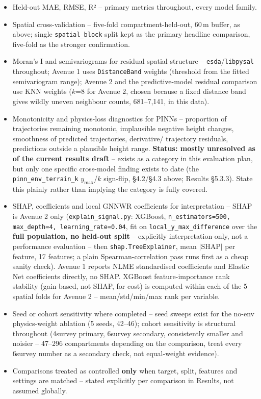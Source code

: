 \begin{itemize}
\setlength\itemsep{0pt}
\item Held-out MAE, RMSE, R² -- primary metrics throughout, every model family.
\item Spatial cross-validation -- five-fold compartment-held-out, 60\,m buffer, as above; single
\texttt{spatial\_block} split kept as the primary headline comparison, five-fold as the stronger
confirmation.
\item Moran's I and semivariograms for residual spatial structure -- \texttt{esda}/\texttt{libpysal}
throughout; Avenue 1 uses \texttt{DistanceBand} weights (threshold from the fitted semivariogram
range); Avenue 2 and the predictive-model residual comparison use KNN weights ($k$=8 for Avenue 2,
chosen because a fixed distance band gives wildly uneven neighbour counts, 681--7,141, in this
data).
\item Monotonicity and physics-loss diagnostics for PINNs -- proportion of trajectories remaining
monotonic, implausible negative height changes, smoothness of predicted trajectories, derivative/
trajectory residuals, predictions outside a plausible height range. \textbf{Status: mostly
unresolved as of the current results draft} -- exists as a category in this evaluation plan, but
only one specific cross-model finding exists to date (the \texttt{pinn\_env\_terrain\_k}
$y_{\max}$/$k$ sign-flip, \S4.2/\S4.3 above; Results \S5.3.3). State this plainly rather than
implying the category is fully covered.
\item SHAP, coefficients and local GNNWR coefficients for interpretation -- SHAP is Avenue 2 only
(\texttt{explain\_signal.py}: XGBoost, \texttt{n\_estimators=500, max\_depth=4, learning\_rate=0.04},
fit on \texttt{local\_y\_max\_difference} over the \textbf{full population, no held-out split} --
explicitly interpretation-only, not a performance evaluation -- then \texttt{shap.TreeExplainer},
mean $|\text{SHAP}|$ per feature, 17 features; a plain Spearman-correlation pass runs first as a
cheap sanity check). Avenue 1 reports NLME standardised coefficients and Elastic Net coefficients
directly, no SHAP. XGBoost feature-importance rank stability (gain-based, not SHAP, for cost) is
computed within each of the 5 spatial folds for Avenue 2 -- mean/std/min/max rank per variable.
\item Seed or cohort sensitivity where completed -- seed sweeps exist for the no-env physics-weight
ablation (5 seeds, 42--46); cohort sensitivity is structural throughout (4survey primary, 6survey
secondary, consistently smaller and noisier -- 47--296 compartments depending on the comparison,
treat every 6survey number as a secondary check, not equal-weight evidence).
\item Comparisons treated as controlled \textbf{only} when target, split, features and settings are
matched -- stated explicitly per comparison in Results, not assumed globally.
\end{itemize}

